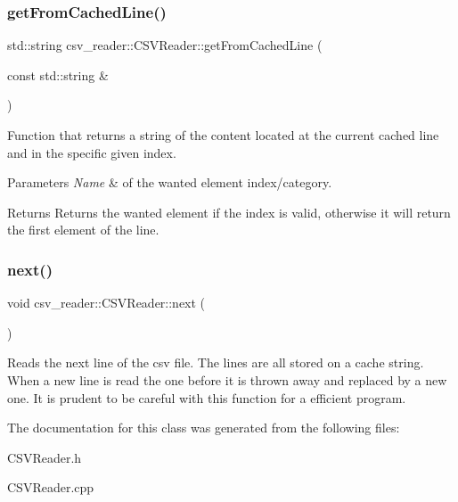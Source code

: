 \subsubsection{\texorpdfstring{get\+From\+Cached\+Line()}{getFromCachedLine()}\hspace{0.1cm}{\footnotesize\ttfamily [2/2]}}
{\footnotesize\ttfamily std\+::string csv\+\_\+reader\+::\+C\+S\+V\+Reader\+::get\+From\+Cached\+Line (\begin{DoxyParamCaption}\item[{const std\+::string \&}]{ }\end{DoxyParamCaption})}

Function that returns a string of the content located at the current cached line and in the specific given index. 
\begin{DoxyParams}{Parameters}
{\em Name} & of the wanted element index/category. \\
\hline
\end{DoxyParams}
\begin{DoxyReturn}{Returns}
Returns the wanted element if the index is valid, otherwise it will return the first element of the line. 
\end{DoxyReturn}
\mbox{\label{classcsv__reader_1_1CSVReader_a935f052bb21d30a21271c14adf1c2cdf}} 
\subsubsection{\texorpdfstring{next()}{next()}}
{\footnotesize\ttfamily void csv\+\_\+reader\+::\+C\+S\+V\+Reader\+::next (\begin{DoxyParamCaption}{ }\end{DoxyParamCaption})}

Reads the next line of the csv file. The lines are all stored on a cache string. When a new line is read the one before it is thrown away and replaced by a new one. It is prudent to be careful with this function for a efficient program. 

The documentation for this class was generated from the following files\+:\begin{DoxyCompactItemize}
\item 
C\+S\+V\+Reader.\+h\item 
C\+S\+V\+Reader.\+cpp\end{DoxyCompactItemize}
